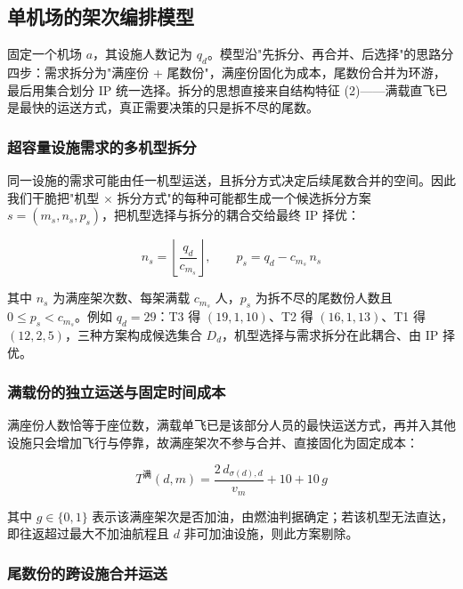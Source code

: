 \documentclass[zihao=-4,a4paper]{ctexart}
\begin{document}
\subsection{单机场的架次编排模型}

固定一个机场 $a$，其设施人数记为 $q_d$。模型沿"先拆分、再合并、后选择"的思路分四步：需求拆分为"满座份 + 尾数份"，满座份固化为成本，尾数份合并为环游，最后用集合划分 IP 统一选择。拆分的思想直接来自结构特征 (2)——满载直飞已是最快的运送方式，真正需要决策的只是拆不尽的尾数。

\subsubsection{超容量设施需求的多机型拆分}

同一设施的需求可能由任一机型运送，且拆分方式决定后续尾数合并的空间。因此我们干脆把"机型 $\times$ 拆分方式"的每种可能都生成一个候选拆分方案 $s=(m_s,n_s,p_s)$，把机型选择与拆分的耦合交给最终 IP 择优：

\begin{equation}
  n_s=\left\lfloor\frac{q_d}{c_{m_s}}\right\rfloor,\qquad p_s=q_d-c_{m_s}\,n_s
\end{equation}

其中 $n_s$ 为满座架次数、每架满载 $c_{m_s}$ 人，$p_s$ 为拆不尽的尾数份人数且 $0\le p_s<c_{m_s}$。例如 $q_d=29$：T3 得 $(19,1,10)$、T2 得 $(16,1,13)$、T1 得 $(12,2,5)$，三种方案构成候选集合 $D_d$，机型选择与需求拆分在此耦合、由 IP 择优。

\subsubsection{满载份的独立运送与固定时间成本}

满座份人数恰等于座位数，满载单飞已是该部分人员的最快运送方式，再并入其他设施只会增加飞行与停靠，故满座架次不参与合并、直接固化为固定成本：

\begin{equation}
  T^{\text{满}}(d,m)=\frac{2\,d_{\sigma(d),d}}{v_m}+10+10\,g
\end{equation}

其中 $g\in\{0,1\}$ 表示该满座架次是否加油，由燃油判据确定；若该机型无法直达，即往返超过最大不加油航程且 $d$ 非可加油设施，则此方案剔除。

\subsubsection{尾数份的跨设施合并运送}
\end{document}
